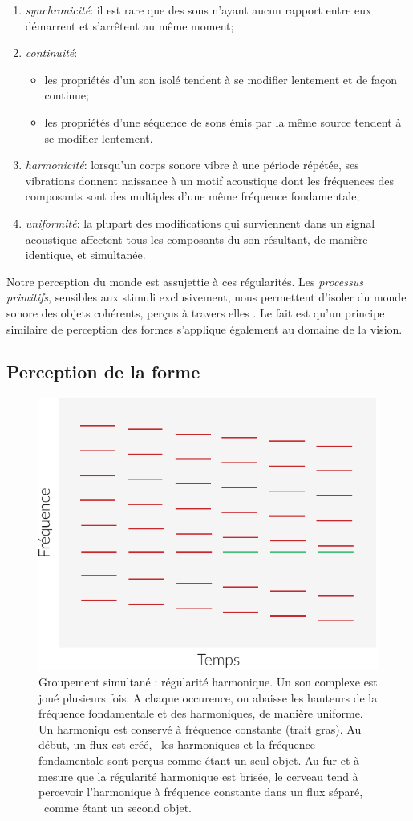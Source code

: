 \begin{enumerate}
\item \emph{synchronicité}: il est rare que des sons n'ayant aucun rapport entre eux démarrent et s'arrêtent au même moment;
\item \emph{continuité}: 
\begin{itemize}
\item les propriétés d'un son isolé tendent à se modifier lentement et de façon continue;
\item les propriétés d'une séquence de sons émis par la même source tendent à se modifier lentement.
\end{itemize}
\item \emph{harmonicité}: lorsqu'un corps sonore vibre à une période répétée, ses vibrations donnent naissance à un motif acoustique dont les fréquences des composants sont des multiples d'une même fréquence fondamentale;
\item \emph{uniformité}: la plupart des modifications qui surviennent dans un signal acoustique affectent tous les composants du son résultant, de manière identique, et simultanée.
\end{enumerate}

Notre perception du monde est assujettie à ces régularités. 
Les \emph{processus primitifs}, sensibles aux stimuli exclusivement, nous permettent d'isoler du monde sonore des objets cohérents, perçus à travers elles \citep{ballas1987interpreting}. Le fait est qu'un principe similaire de perception des formes s'applique également au domaine de la vision.

\subsection{Perception de la forme}

\begin{figure}[t]
        \myfloatalign
        \includegraphics[width=.5\linewidth]{gfx/harmo-eps-converted-to}
        \caption[Groupement simultané : régularité harmonique]{Groupement simultané : régularité harmonique. Un son complexe est joué plusieurs fois. A chaque occurence, on abaisse les hauteurs de la fréquence fondamentale et des harmoniques, de manière uniforme. Un harmoniqu est conservé à fréquence constante (trait gras). Au début, un flux est créé, \ie~les harmoniques et la fréquence fondamentale sont perçus comme étant un seul objet. Au fur et à mesure que la régularité harmonique est brisée, le cerveau tend à percevoir l'harmonique à fréquence constante dans un flux séparé, \ie~comme étant un second objet.}\label{fig:harmo}
\end{figure}

